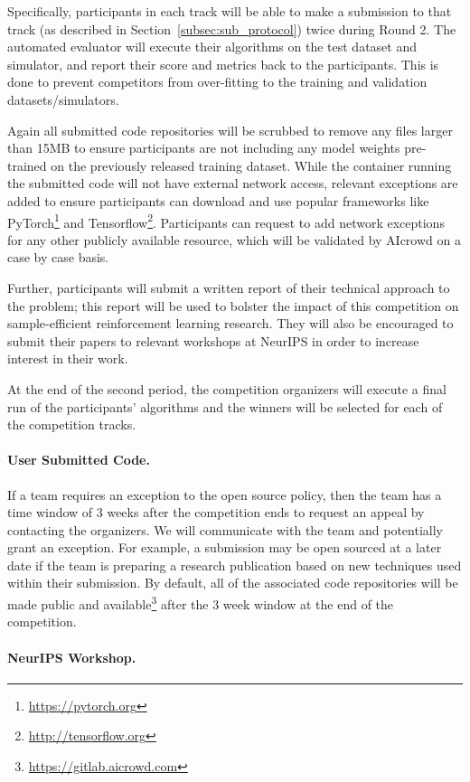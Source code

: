 Specifically, participants in each track will be able to make a submission to that track (as described in Section~\ref{subsec:sub_protocol}) twice during Round 2. The automated evaluator will execute their algorithms on the test dataset and simulator, and report their score and metrics back to the participants. This is done to prevent competitors from over-fitting to the training and validation datasets/simulators.

Again all submitted code repositories will be scrubbed to remove any files larger than 15MB to ensure participants are not including any model weights pre-trained on the previously released training dataset. While the container running the submitted code will not have external network access, relevant exceptions are added to ensure participants can download and use popular frameworks like PyTorch\footnote{\url{https://pytorch.org}} and Tensorflow\footnote{\url{http://tensorflow.org}}. Participants can request to add network exceptions for any other publicly available resource, which will be validated by AIcrowd on a case by case basis.

Further, participants will submit a written report of their technical approach to the problem; this report will be used to bolster the impact of this competition on sample-efficient reinforcement learning research. They will also be encouraged to submit their papers to relevant workshops at NeurIPS in order to increase interest in their work.

At the end of the second period, the competition organizers will execute a final run of the participants’ algorithms and the winners will be selected for each of the competition tracks. 

\paragraph{User Submitted Code.} 
If a team requires an exception to the open source policy, then the team has a time window of 3 weeks after the competition ends to request an appeal by contacting the organizers. We will communicate with the team and potentially grant an exception. For example, a submission may be open sourced at a later date if the team is preparing a research publication based on new techniques used within their submission.
By default, all of the associated code repositories will be made public and available\footnote{\url{https://gitlab.aicrowd.com}} after the 3 week window at the end of the competition.

\paragraph{NeurIPS Workshop.} 

